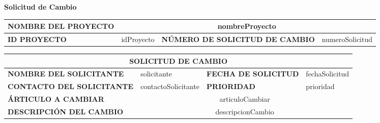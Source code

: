\documentclass{article}
\begin{document}
\begin{center}
{\huge\textbf{Solicitud de Cambio}}\\[2cm]
\end{center}

\vspace{0.5cm}

\renewcommand{\arraystretch}{1.5} %

\noindent
\begin{tabularx}{\textwidth}{| X | X | X | X |}
\hline
\multicolumn{1}{|X|}{\cellcolor{gray!40}\textbf{NOMBRE DEL PROYECTO}} & \multicolumn{3}{|c|}{{{nombreProyecto}}} \\ \hline
\cellcolor{gray!40}\textbf{ID PROYECTO}  & {{idProyecto}} & \cellcolor{gray!40}\textbf{NÚMERO DE SOLICITUD DE CAMBIO} & {{numeroSolicitud}} \\ \hline
\end{tabularx}

\vspace{0.5cm}

\noindent
\begin{tabularx}{\textwidth}{| X | X | X | X |}
\hline
\multicolumn{4}{|c|}{\cellcolor{blue!30}\textbf{SOLICITUD DE CAMBIO}} \\ \hline
\cellcolor{gray!40}\textbf{NOMBRE DEL SOLICITANTE} & {{solicitante}} & \cellcolor{gray!40}\textbf{FECHA DE SOLICITUD} & {{fechaSolicitud}} \\ \hline
\cellcolor{gray!40}\textbf{CONTACTO DEL SOLICITANTE} & {{contactoSolicitante}} & \cellcolor{gray!40}\textbf{PRIORIDAD} & {{prioridad}} \\ \hline
\multicolumn{1}{|X|}{\cellcolor{gray!40}\textbf{ÁRTICULO A CAMBIAR}} & \multicolumn{3}{|c|}{{{articuloCambiar}}} \\ \hline
\multicolumn{1}{|X|}{\cellcolor{gray!40}\textbf{DESCRIPCIÓN DEL CAMBIO}} & \multicolumn{3}{|c|}{{{descripcionCambio}}} \\ \hline
\end{tabularx}
\end{document}
